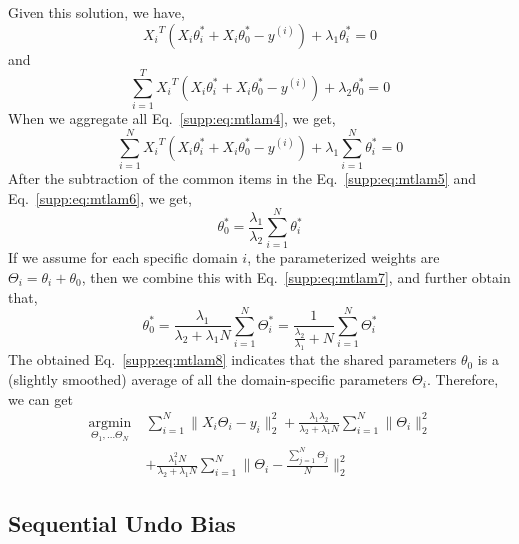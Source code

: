 \documentclass[runningheads]{llncs}
\begin{document}
Given this solution, we have,
\begin{equation}
{X_{i}}^T (X_{i}\theta_{i}^* + X_{i}\theta_{0}^* - y^{(i)}) + \lambda_1 \theta_{i}^* = 0
\label{supp:eq:mtlam4}
\end{equation}
and
\begin{equation}
\sum_{i=1}^{T} {X_{i}}^T (X_{i}\theta_{i}^* + X_{i}\theta_{0}^* - y^{(i)}) + \lambda_2 \theta_{0}^* = 0
\label{supp:eq:mtlam5}
\end{equation}
When we aggregate all Eq.~\ref{supp:eq:mtlam4}, we get,
\begin{equation}
\sum_{i=1}^{N}{X_{i}}^T (X_{i}\theta_{i}^* + X_{i}\theta_{0}^* - y^{(i)}) + \lambda_1 \sum_{i=1}^{N}\theta_{i}^* = 0
\label{supp:eq:mtlam6}
\end{equation}
After the subtraction of the common items in the Eq.~\ref{supp:eq:mtlam5} and Eq.~\ref{supp:eq:mtlam6}, we get,
\begin{equation}
\theta_0^{*} = \frac{\lambda_1}{\lambda_2} \sum_{i=1}^N \theta_i^*
\label{supp:eq:mtlam7}
\end{equation}
If we assume for each specific domain $i$, the parameterized weights are $\Theta_i= \theta_i + \theta_0$, then we combine this with Eq.~\ref{supp:eq:mtlam7}, and further obtain that,
\begin{equation}
\theta_0^{*} = \frac{\lambda_1}{\lambda_2 + \lambda_1 N} \sum_{i=1}^N \Theta_i^* = \frac{1}{\frac{\lambda_2}{\lambda_1} + N} \sum_{i=1}^{N} \Theta_i^*
\label{supp:eq:mtlam8}
\end{equation}
The obtained Eq.~\ref{supp:eq:mtlam8} indicates that the shared parameters $\theta_0$ is a (slightly smoothed) average of all the domain-specific parameters $\Theta_i$. Therefore, we can get 
\begin{equation}
\label{supp:eq:Undo-Bias-deduce-r}
\begin{aligned}
\underset{\Theta_{1},\dots \Theta_{N}}{\operatorname{argmin}}~ & \sum_{i=1}^{N} \| \mathit{X}_{i}\Theta_{i} - y_{i}  \|_{2}^{2} 
+ \frac{\lambda_{1}\lambda_{2}}{\lambda_{2} + \lambda_{1}N} \sum_{i=1}^{N} \|\Theta_{i} \|_{2}^{2} \\ 
& + \frac{{\lambda_{1}^{2}N}}{\lambda_{2} + \lambda_{1}N} \sum_{i=1}^{N} \| \Theta_{i} - \frac{\sum_{j=1}^{N}\Theta_{j}}{N}   \|_{2}^{2}
\end{aligned}
\end{equation}

\subsection{Sequential Undo Bias}\label{appendix:hundo-bias}
\end{document}
